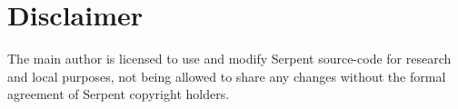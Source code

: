 \documentclass[twoside,a4paper,12pt,english,draft]{anstrans}
\begin{document}
\section{Disclaimer}
The main author is licensed to use and modify Serpent source-code for research
and local purposes, not being allowed to share any changes without the formal
agreement of Serpent copyright holders.


\end{document}
